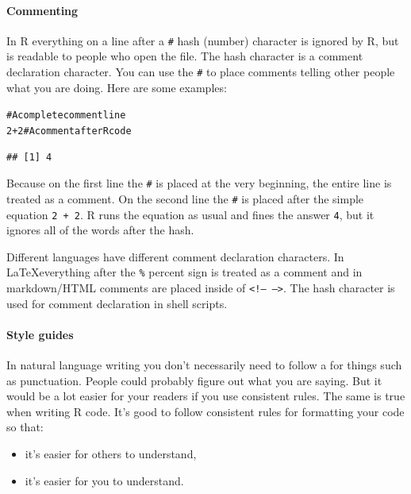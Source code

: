 \documentclass[ChapterTOCs,krantz1]{krantz}\usepackage{graphicx, color}
\makeatletter
\newcommand{\hlcomment}[1]{\textcolor[rgb]{0.180392156862745,0.6,0.341176470588235}{#1}}%
\newenvironment{kframe}{%
 \def\at@end@of@kframe{}%
 \ifinner\ifhmode%
  \def\at@end@of@kframe{\end{minipage}}%
  \begin{minipage}{\columnwidth}%
 \fi\fi%
 \def\FrameCommand##1{\hskip\@totalleftmargin \hskip-\fboxsep
 \colorbox{shadecolor}{##1}\hskip-\fboxsep
     \hskip-\linewidth \hskip-\@totalleftmargin \hskip\columnwidth}%
 \MakeFramed {\advance\hsize-\width
   \@totalleftmargin\z@ \linewidth\hsize
   \@setminipage}}%
 {\par\unskip\endMakeFramed%
 \at@end@of@kframe}
\newenvironment{knitrout}{}{} %
\makeatother
\begin{document}
\paragraph{Commenting}
In R everything on a line after a {\tt{#}} hash (number) character is ignored by R, but is readable to people who open the file. The hash character is a comment declaration character. You can use the {\tt{#}} to place comments telling other people what you are doing. Here are some examples:

\begin{knitrout}
\color{fgcolor}\begin{kframe}
\begin{alltt}
\hlcomment{# A complete comment line}
2 + 2  \hlcomment{# A comment after R code}
\end{alltt}
\begin{verbatim}
## [1] 4
\end{verbatim}
\end{kframe}
\end{knitrout}


Because on the first line the {\tt{\#}} is placed at the very beginning, the entire line is treated as a comment. On the second line the {\tt{\#}} is placed after the simple equation {\tt{2 + 2}}. R runs the equation as usual and fines the answer {\tt{4}}, but it ignores all of the words after the hash. 

Different languages have different comment declaration characters. In \LaTeX everything after the {\tt{\%}} percent sign is treated as a comment and in markdown/HTML comments are placed inside of {\tt{\textless !-- --\textgreater}}. The hash character is used for comment declaration in shell scripts.

\paragraph{Style guides}
In natural language writing you don't necessarily need to follow a  for things such as punctuation. People could probably figure out what you are saying. But it would be a lot easier for your readers if you use consistent rules. The same is true when writing R code. It's good to follow consistent rules for formatting your code so that:

\begin{itemize}
    \item it's easier for others to understand,
    \item it's easier for you to understand.
\end{itemize}
\end{document}
